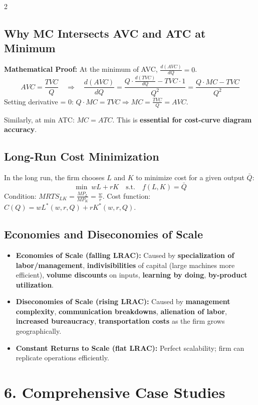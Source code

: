 \documentclass[10pt,a4paper]{article}
\begin{document}
\begin{multicols}{2}
\subsection*{Why MC Intersects AVC and ATC at Minimum}
\textbf{Mathematical Proof:} At the minimum of AVC, $\frac{d(AVC)}{dQ} = 0$.
\[
AVC = \frac{TVC}{Q} \quad \Rightarrow \quad \frac{d(AVC)}{dQ} = \frac{Q \cdot \frac{d(TVC)}{dQ} - TVC \cdot 1}{Q^2} = \frac{Q \cdot MC - TVC}{Q^2}
\]
Setting derivative = 0: $Q \cdot MC = TVC \Rightarrow MC = \frac{TVC}{Q} = AVC$.

Similarly, at min ATC: $MC = ATC$. This is \textbf{essential for cost-curve diagram accuracy}.

\subsection*{Long-Run Cost Minimization}
In the long run, the firm chooses $L$ and $K$ to minimize cost for a given output $\bar{Q}$:
\[
\min \; wL + rK \quad \text{s.t.} \quad f(L, K) = \bar{Q}
\]
Condition: $MRTS_{LK} = \frac{MP_L}{MP_K} = \frac{w}{r}$.
Cost function: $C(Q) = wL^*(w,r,Q) + rK^*(w,r,Q)$.

\subsection*{Economies and Diseconomies of Scale}
\begin{itemize}[leftmargin=*,nosep]
    \item \textbf{Economies of Scale (falling LRAC):} Caused by \textbf{specialization of labor/management}, \textbf{indivisibilities} of capital (large machines more efficient), \textbf{volume discounts} on inputs, \textbf{learning by doing}, \textbf{by-product utilization}.
    \item \textbf{Diseconomies of Scale (rising LRAC):} Caused by \textbf{management complexity}, \textbf{communication breakdowns}, \textbf{alienation of labor}, \textbf{increased bureaucracy}, \textbf{transportation costs} as the firm grows geographically.
    \item \textbf{Constant Returns to Scale (flat LRAC):} Perfect scalability; firm can replicate operations efficiently.
\end{itemize}

\section*{6. Comprehensive Case Studies}


\end{multicols}
\end{document}
